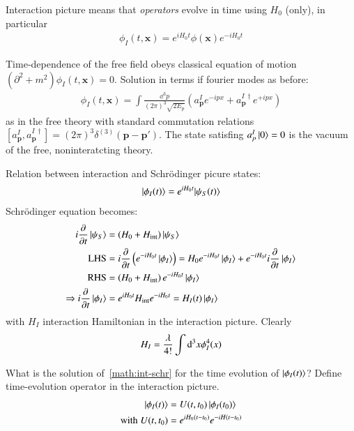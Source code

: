 Interaction picture means that \textit{operators} evolve in time using $H_0$ (only), in particular 
\begin{align}
	\phi_I(t,\pmb{x}) = e^{iH_0t}\phi(\pmb{x})e^{-iH_0t}
\end{align}

Time-dependence of the free field obeys classical equation of motion $\left(\partial^2+m^2 \right)\phi_I(t,\pmb{x}) = 0$. Solution in terms if fourier modes as before:
\begin{align}
	\phi_I(t,\pmb{x}) = \int \frac{\dd^3 p}{(2\pi)^3\sqrt{2E_p}} (a^I_{\pmb{p}}e^{-ipx} + a^{I\,\dagger}_{\pmb{p}}e^{+ipx})
\end{align}
as in the free theory with standard commutation relations $[a^I_{\pmb{p}}, a^{I\,\dagger}_{\pmb{p}}] = (2\pi)^3\delta^{(3)}(\pmb{p}-\pmb{p}')$. The state satisfing $a^I_p \ket{0} = 0$ is the vacuum of the free, noninteratcting theory.

Relation between interaction and Schrödinger picure states:
\begin{align}
	\ket{\phi_I(t)} = e^{iH_0t}{\ket{\psi_S(t)}}
\end{align}
Schrödinger equation becomes: 
\begin{align}
	i\frac{\partial}{\partial t}\ket{\psi_S} &= (H_0 + H_\text{int})\ket{\psi_S} \notag\\
	\text{LHS} &= i \frac{\partial}{\partial t} \left( e^{-iH_0t}\ket{\phi_I} \right) = H_0 e^{-iH_0t}\ket{\phi_I} + e^{-iH_0t}i\frac{\partial}{\partial t}\ket{\phi_I} \notag\\
	\text{RHS}														&= \left(H_0 + H_\text{int}\right)e^{-iH_0t}\ket{\phi_I} \notag\\
	\Rightarrow i\frac{\partial}{\partial t}\ket{\phi_I} &= e^{iH_0t}H_\text{int} e^{-iH_0t} = H_I(t)\ket{\phi_I} \label{math:int-schr}
\end{align}
with $H_I$ interaction Hamiltonian in the interaction picture. Clearly
\begin{align}
	H_I = \frac{\lambda}{4!}\int\dd^3x\phi_I^4(x) \notag
\end{align}

What is the solution of~\ref{math:int-schr} for the time evolution of $\ket{\phi_I(t)}$? Define time-evolution operator in the interaction picture.
\begin{align}
	\ket{\phi_I(t)} &= U(t,t_0)\ket{\phi_I(t_0)}\label{math:int-schr2}\\
	\text{with} \; U(t,t_0) &= e^{iH_0(t-t_0)}e^{-iH(t-t_0)} 
\end{align}

